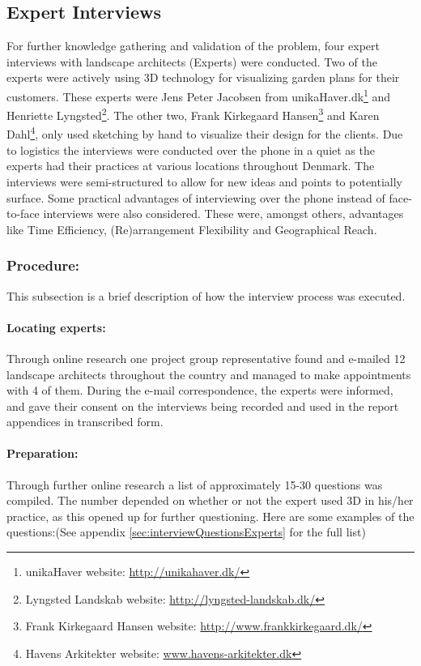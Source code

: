 	\subsection{Expert Interviews}\label{sec:expertInterviews}
	For further knowledge gathering and validation of the problem, four expert interviews with landscape architects (Experts) were conducted. Two of the experts were actively using 3D technology for visualizing garden plans for their customers. These experts were Jens Peter Jacobsen from unikaHaver.dk\footnote{unikaHaver website: \url{http://unikahaver.dk/}} and Henriette Lyngsted\footnote{Lyngsted Landskab website: \url{http://lyngsted-landskab.dk/}}. The other two, Frank Kirkegaard Hansen\footnote{Frank Kirkegaard Hansen website: \url{http://www.frankkirkegaard.dk/}} and Karen Dahl\footnote{Havens Arkitekter website: \url{www.havens-arkitekter.dk}}, only used sketching by hand to visualize their design for the clients. Due to logistics the interviews were conducted over the phone in a quiet as the experts had their practices at various locations throughout Denmark. The interviews were semi-structured to allow for new ideas and points to potentially surface. Some practical advantages of interviewing over the phone instead of face-to-face interviews were also considered. These were, amongst others, advantages like Time Efficiency, (Re)arrangement Flexibility and Geographical Reach\cite{telephoneInterview}.
	
	\subsubsection{Procedure:}
	This subsection is a brief description of how the interview process was executed.
	
	\paragraph*{Locating experts:}
	Through online research one project group representative found and e-mailed 12 landscape architects throughout the country and managed to make appointments with 4 of them. During the e-mail correspondence, the experts were informed, and gave their consent on the interviews being recorded and used in the report appendices in transcribed form.
	
	\paragraph*{Preparation:}
	Through further online research a list of approximately 15-30 questions was compiled. The number depended on whether or not the expert used 3D in his/her practice, as this opened up for further questioning. Here are some examples of the questions:(See appendix \ref{sec:interviewQuestionsExperts} for the full list)
	
